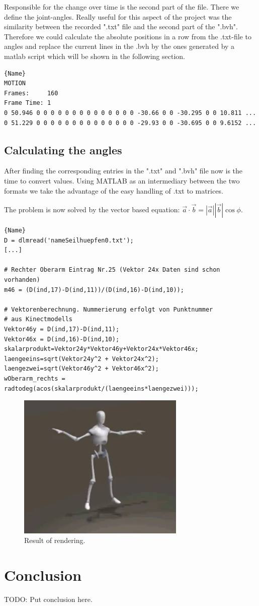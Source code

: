 \documentclass[a4paper]{article}
\begin{document}
Responsible for the change over time is the second part of the file.
There we define the joint-angles.
Really useful for this aspect of the project was the similarity between the recorded ".txt" file and the second part of the ".bvh".
Therefore we could calculate the absolute positions in a row from the .txt-file to angles and replace the current lines in the .bvh by the ones generated by a matlab script which will be shown in the following section.

\begin{lstlisting}[caption=Motionpart of .bvh]{Name}
MOTION
Frames:     160
Frame Time: 1                
0 50.946 0 0 0 0 0 0 0 0 0 0 0 0 0 0 -30.66 0 0 -30.295 0 0 10.811 ...
0 51.229 0 0 0 0 0 0 0 0 0 0 0 0 0 0 -29.93 0 0 -30.695 0 0 9.6152 ...
\end{lstlisting}

\subsection{Calculating the angles}

After finding the corresponding entries in the ".txt" and ".bvh" file now is the time to convert values.
Using MATLAB as an intermediary between the two formats we take the advantage of the easy handling of .txt to matrices.

The problem is now solved by the vector based equation: $\vec a \cdot \vec b = \left|\vec a \right| \left|\vec b \right| \cos \phi$.

\begin{lstlisting}[caption=Calculating the angle]{Name}
D = dlmread('nameSeilhuepfen0.txt');
[...]

# Rechter Oberarm Eintrag Nr.25 (Vektor 24x Daten sind schon vorhanden)
m46 = (D(ind,17)-D(ind,11))/(D(ind,16)-D(ind,10));

# Vektorenberechnung. Nummerierung erfolgt von Punktnummer 
# aus Kinectmodells
Vektor46y = D(ind,17)-D(ind,11);
Vektor46x = D(ind,16)-D(ind,10);
skalarprodukt=Vektor24y*Vektor46y+Vektor24x*Vektor46x;
laengeeins=sqrt(Vektor24y^2 + Vektor24x^2);
laengezwei=sqrt(Vektor46y^2 + Vektor46x^2); 
wOberarm_rechts = radtodeg(acos(skalarprodukt/(laengeeins*laengezwei)));
\end{lstlisting}

\begin{figure}
	\centering
	\includegraphics[width=8cm]{3dRender.PNG}
	\caption{Result of rendering.}
	\label{fig:3drender}
\end{figure}

\section{Conclusion}

TODO: Put conclusion here.

\newpage

\end{document}
